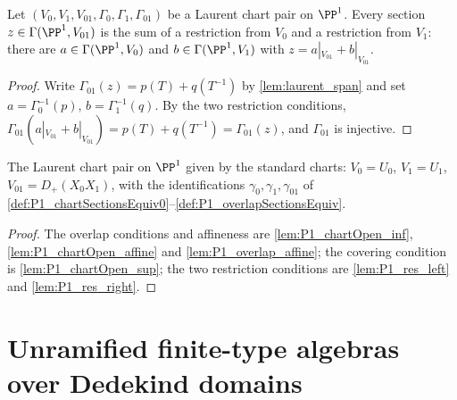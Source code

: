 \begin{theorem}
  \label{thm:laurentChartPair_span}
  \leanok
  Let \((V_0, V_1, V_{01}, \Gamma_0, \Gamma_1, \Gamma_{01})\) be a Laurent chart pair on
  \(\PP^1\). Every section \(z \in \Gamma(\PP^1, V_{01})\) is the sum of a restriction from
  \(V_0\) and a restriction from \(V_1\): there are \(a \in \Gamma(\PP^1, V_0)\) and
  \(b \in \Gamma(\PP^1, V_1)\) with \(z = a|_{V_{01}} + b|_{V_{01}}\).
\end{theorem}
\begin{proof}
  \leanok
  Write \(\Gamma_{01}(z) = p(T) + q(T^{-1})\) by \ref{lem:laurent_span} and set
  \(a = \Gamma_0^{-1}(p)\), \(b = \Gamma_1^{-1}(q)\). By the two restriction conditions,
  \(\Gamma_{01}(a|_{V_{01}} + b|_{V_{01}}) = p(T) + q(T^{-1}) = \Gamma_{01}(z)\), and
  \(\Gamma_{01}\) is injective.
\end{proof}

\begin{definition}
  \label{def:P1_laurentChartPair}
  \leanok
  The Laurent chart pair on \(\PP^1\) given by the standard charts: \(V_0 = U_0\),
  \(V_1 = U_1\), \(V_{01} = D_+(X_0X_1)\), with the identifications \(\gamma_0, \gamma_1,
  \gamma_{01}\) of \ref{def:P1_chartSectionsEquiv0}--\ref{def:P1_overlapSectionsEquiv}.
\end{definition}
\begin{proof}
  \leanok
  The overlap conditions and affineness are \ref{lem:P1_chartOpen_inf},
  \ref{lem:P1_chartOpen_affine} and \ref{lem:P1_overlap_affine}; the covering condition is
  \ref{lem:P1_chartOpen_sup}; the two restriction conditions are \ref{lem:P1_res_left} and
  \ref{lem:P1_res_right}.
\end{proof}

\section{Unramified finite-type algebras over Dedekind domains}

